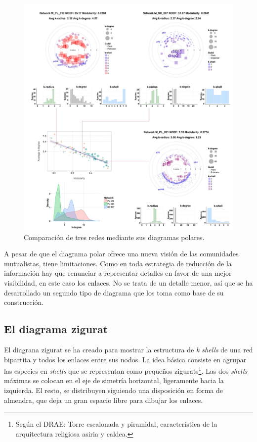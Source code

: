 \begin{figure}[h!]
\centering
\includegraphics[scale=0.75]{Figures/VIS_Modvskdegree3.PDF}
\caption[PolarExample]{Comparación de tres redes mediante sus diagramas polares.}
\label{fig:VIS_Modvskdegree3}
\end{figure}

A pesar de que el diagrama polar ofrece una nueva visión de las comunidades mutualistas, tiene limitaciones. Como en toda estrategia de reducción de la información hay que renunciar a representar detalles en favor de una mejor visibilidad, en este caso los enlaces. No se trata de un detalle menor, así que se ha desarrollado un segundo tipo de diagrama que los toma como base de su construcción.

\subsection{El diagrama zigurat}

El diagrana zigurat se ha creado para mostrar la estructura de \textit{k shells} de una red bipartita y todos los enlaces entre sus nodos. La idea básica consiste en agrupar las especies en \textit{shells} que se representan como pequeños zigurats\footnote{Según el DRAE: Torre escalonada y piramidal, característica de la arquitectura religiosa asiria y caldea.}. Las dos \textit{shells} máximas se colocan en el eje de simetría horizontal, ligeramente hacia la izquierda. El resto, se distribuyen siguiendo una disposición en forma de almendra, que deja un gran espacio libre para dibujar los enlaces.

